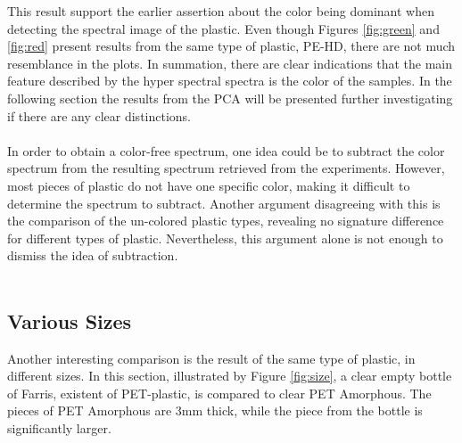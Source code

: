 
\noindent
This result support the earlier assertion about the color being dominant when detecting the spectral image of the plastic. Even though Figures \ref{fig:green} and \ref{fig:red} present results from the same type of plastic, PE-HD, there are not much resemblance in the plots. In summation, there are clear indications that the main feature described by the hyper spectral spectra is the color of the samples. In the following section the results from the PCA will be presented further investigating if there are any clear distinctions.
\\\\
In order to obtain a color-free spectrum, one idea could be to subtract the color spectrum from the resulting spectrum retrieved from the experiments. However, most pieces of plastic do not have one specific color, making it difficult to determine the spectrum to subtract. Another argument disagreeing with this is the comparison of the un-colored plastic types, revealing no signature difference for different types of plastic. Nevertheless, this argument alone is not enough to dismiss the idea of subtraction. 
\\\\
\subsection{Various Sizes}
Another interesting comparison is the result of the same type of plastic, in different sizes. In this section, illustrated by Figure \ref{fig:size}, a clear empty bottle of Farris, existent of PET-plastic, is compared to clear PET Amorphous. The pieces of PET Amorphous are 3mm thick, while the piece from the bottle is significantly larger. 

